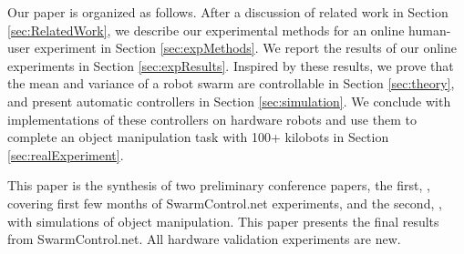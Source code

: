  Our paper is organized as follows.  After a discussion of related work in Section \ref{sec:RelatedWork},  we describe our experimental methods for an online human-user experiment in Section \ref{sec:expMethods}. We report the results of our online experiments in Section \ref{sec:expResults}. Inspired by these results, we prove that the mean and variance of a robot swarm are controllable in Section \ref{sec:theory}, and present automatic controllers in Section \ref{sec:simulation}. We conclude with implementations of these controllers on hardware robots and use them to complete an object manipulation task  with 100+ kilobots in Section \ref{sec:realExperiment}.
 
 This paper is the synthesis of two preliminary conference papers, the first, \cite{swarmcontrol2013}, covering first few months of SwarmControl.net experiments, and the second, \cite{ShahrokhiIROS2015}, with simulations of object manipulation.  This paper presents the final results from SwarmControl.net.  All hardware validation experiments are new.

